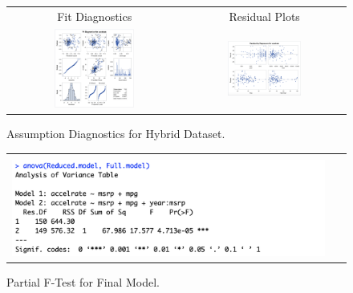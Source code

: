 \documentclass[acmsmall]{acmart}
\begin{document}
\begin{figure}[H] %
	\centering
	\begin{tabular}{p{} p{}}
	\hline
	\multicolumn{1}{|c|}{Fit Diagnostics} & \multicolumn{1}{|c|}{Residual Plots} \\
		\multicolumn{1}{|c|}{\includegraphics[width=0.48\textwidth]{../graphics/Assumptions1}} &
		\multicolumn{1}{|c|}{\includegraphics[width=0.48\textwidth]{../graphics/Assumptions2}}\\
		\hline
	\end{tabular}		
	\caption{Assumption Diagnostics for Hybrid Dataset.} %
	\label{fig:ASS}
\end{figure}

\begin{figure}[H] %
	\centering
	\begin{tabular}{| p{}|}
	\hline
	\\
	\includegraphics[width=0.95\textwidth]{../graphics/PartialFTest}\\
	\hline
	\end{tabular}	
	\caption{Partial F-Test for Final Model.} %
	\label{fig:PFT}
\end{figure}
\end{document}
